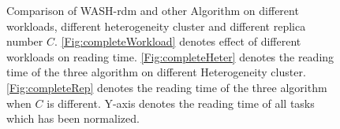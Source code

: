 \documentclass[conference]{IEEEtran}
\begin{document}
\begin{figure}[!t]
	\centering
	\quad\quad %
	\quad\quad
	\vspace{-1ex}
	\caption{Comparison of WASH-rdm and other Algorithm on different workloads, different heterogeneity cluster and different replica number $C$. \ref{Fig:completeWorkload} denotes effect of different workloads on reading time. \ref{Fig:completeHeter} denotes the reading time of the three algorithm on different Heterogeneity cluster. \ref{Fig:completeRep} denotes the reading time of the three algorithm when $C$ is different. Y-axis denotes the reading time of all tasks which has been normalized.}
	\label{Fig:complete}
\end{figure}
\end{document}
